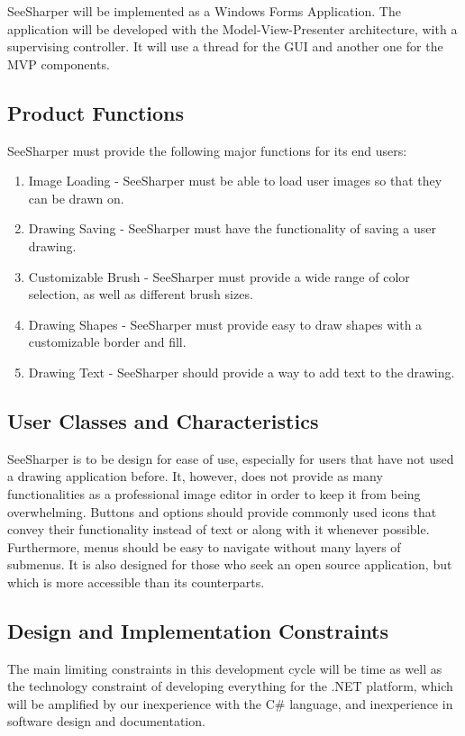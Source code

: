 \documentclass[12pt]{article}
\begin{document}
SeeSharper will be implemented as a Windows Forms Application. The application will be developed with the Model-View-Presenter architecture, with a supervising controller. It will use a thread for the GUI and another one for the MVP components.
\subsection{Product Functions}
SeeSharper must provide the following major functions for its end users:
\begin{enumerate}
\item Image Loading - SeeSharper must be able to load user images so that they can be drawn on.
\item Drawing Saving - SeeSharper must have the functionality of saving a user drawing.
\item Customizable Brush - SeeSharper must provide a wide range of color selection, as well as different brush sizes.
\item Drawing Shapes - SeeSharper must provide easy to draw shapes with a customizable border and fill. 
\item Drawing Text - SeeSharper should provide a way to add text to the drawing.
\end{enumerate}
\subsection{User Classes and Characteristics}
SeeSharper is to be design for ease of use, especially for users that have not used a drawing application before. It, however, does not provide as many functionalities as a professional image editor in order to keep it from being overwhelming. Buttons and options should provide commonly used icons that convey their functionality instead of text or along with it whenever possible. Furthermore, menus should be easy to navigate without many layers of submenus. It is also designed for those who seek an open source application, but which is more accessible than its counterparts.
\subsection{Design and Implementation Constraints}
The main limiting constraints in this development cycle will be time as well as the technology constraint of developing everything for the .NET platform, which will be amplified by our inexperience with the C\# language, and inexperience in software design and documentation.
\end{document}
